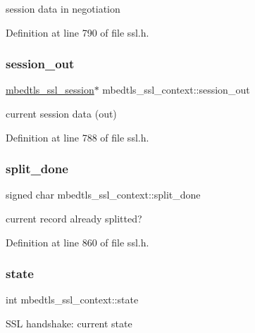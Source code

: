 session data in negotiation 

Definition at line 790 of file ssl.\+h.

\mbox{\label{structmbedtls__ssl__context_a9009145707b10147eb41df26eca9629c}} 
\subsubsection{\texorpdfstring{session\+\_\+out}{session\_out}}
{\footnotesize\ttfamily \mbox{\hyperlink{structmbedtls__ssl__session}{mbedtls\+\_\+ssl\+\_\+session}}$\ast$ mbedtls\+\_\+ssl\+\_\+context\+::session\+\_\+out}

current session data (out) 

Definition at line 788 of file ssl.\+h.

\mbox{\label{structmbedtls__ssl__context_a0b9cdd63126690b0071c5b1821153a5a}} 
\subsubsection{\texorpdfstring{split\+\_\+done}{split\_done}}
{\footnotesize\ttfamily signed char mbedtls\+\_\+ssl\+\_\+context\+::split\+\_\+done}

current record already splitted? 

Definition at line 860 of file ssl.\+h.

\mbox{\label{structmbedtls__ssl__context_a32cd4a2bcd224f570b5a350e277ccca3}} 
\subsubsection{\texorpdfstring{state}{state}}
{\footnotesize\ttfamily int mbedtls\+\_\+ssl\+\_\+context\+::state}

S\+SL handshake\+: current state 


